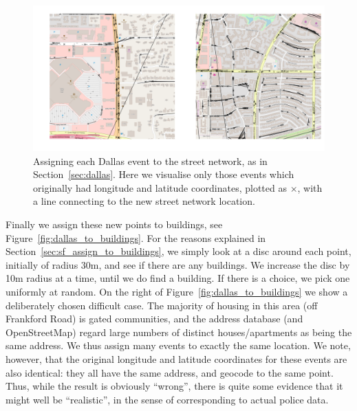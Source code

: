 \documentclass[twoside,a4paper,twocolumn,10pt]{article}
\theoremstyle{plain}
\theoremstyle{definition}
\begin{document}
\begin{figure}
  \includegraphics[width=\textwidth]{dallas_coords_to_streets.png}
  \caption{Assigning each Dallas event to the street network, as in Section~\ref{sec:dallas}.
Here we visualise only those events which originally had longitude and latitude coordinates,
plotted as $\times$, with a line connecting to the new street network location.}
  \label{fig:dallas_to_streets}
\end{figure}

Finally we assign these new points to buildings, see Figure~\ref{fig:dallas_to_buildings}.
For the reasons explained in Section~\ref{sec:sf_assign_to_buildings},
we simply look at a disc around each point, initially of
radius 30m, and see if there are any buildings.  We increase the disc by 10m radius at a time,
until we do find a building.  If there is a choice, we pick one uniformly at random.
On the right of Figure~\ref{fig:dallas_to_buildings} we show a deliberately chosen difficult
case.  The majority of housing in this area (off Frankford Road) is gated communities, and the
address database (and OpenStreetMap) regard large numbers of distinct houses/apartments as being
the same address.  We thus assign many events to exactly the same location.  We note, however,
that the original longitude and latitude coordinates for these events are also identical:
they all have the same address, and geocode to the same point.  Thus, while the result is
obviously ``wrong'', there is quite some evidence that it might well be ``realistic'', in
the sense of corresponding to actual police data.
\end{document}

